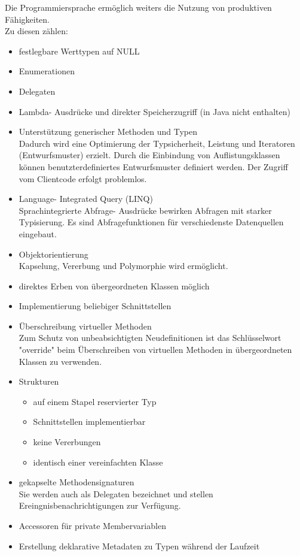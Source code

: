 \documentclass[12pt,a4paper]{report}
\begin{document}
Die Programmiersprache ermöglich weiters die Nutzung von produktiven Fähigkeiten.
\\Zu diesen zählen:
\begin{itemize}
\item festlegbare Werttypen auf NULL
\item Enumerationen
\item Delegaten
\item Lambda- Ausdrücke und direkter Speicherzugriff (in Java nicht enthalten)
\item Unterstützung generischer Methoden und Typen\\
Dadurch wird eine Optimierung der Typsicherheit, Leistung und Iteratoren (Entwurfsmuster) erzielt. Durch die Einbindung von Auflistungsklassen können benutzterdefiniertes Entwurfsmuster definiert werden. Der Zugriff vom Clientcode erfolgt problemlos.
\item Language- Integrated Query (LINQ)\\
Sprachintegrierte Abfrage- Ausdrücke bewirken Abfragen mit starker Typisierung. Es sind Abfragefunktionen für verschiedenste Datenquellen eingebaut.
\item Objektorientierung\\
Kapselung, Vererbung und Polymorphie wird ermöglicht.
\item direktes Erben von übergeordneten Klassen möglich
\item Implementierung beliebiger Schnittstellen
\item Überschreibung virtueller Methoden\\
Zum Schutz von unbeabsichtigten Neudefinitionen ist das Schlüsselwort "{}override"{} beim Überschreiben von virtuellen Methoden in übergeordneten Klassen zu verwenden.
\item  Strukturen
\begin{itemize}
\item auf einem Stapel reservierter Typ
\item Schnittstellen implementierbar
\item keine Vererbungen
\item identisch einer vereinfachten Klasse
\end{itemize}
\item gekapselte Methodensignaturen\\
Sie werden auch als Delegaten bezeichnet und stellen Ereingnisbenachrichtigungen zur Verfügung.
\item Accessoren für private Membervariablen
\item Erstellung deklarative Metadaten zu Typen während der Laufzeit

\end{itemize}
\end{document}
